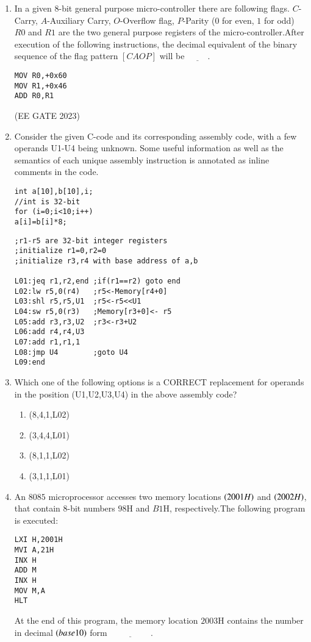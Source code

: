 \begin{enumerate}[label=\arabic*.,ref=\theenumi]
\item In a given $8$-bit general purpose micro-controller there are following flags. $C$-Carry, $A$-Auxiliary Carry, $O$-Overflow flag, $P$-Parity ($0$ for even, $1$ for odd) $R0$ and $R1$ are the two general purpose registers of the micro-controller.After execution of the following instructions, the decimal equivalent of the binary sequence of the flag pattern $[CAOP]$ will be $\underline{\hspace{1cm}}$.\\


\begin{lstlisting}
MOV R0,+0x60
MOV R1,+0x46 
ADD R0,R1
\end{lstlisting}
    
\hfill{(EE GATE 2023)}\\


\item 
Consider the given C-code and its corresponding assembly code, with a few operands U1-U4 being unknown. Some useful information as well as the semantics of each unique assembly instruction is annotated as inline comments in the code.

\begin{lstlisting}
int a[10],b[10],i;
//int is 32-bit
for (i=0;i<10;i++)
a[i]=b[i]*8;
\end{lstlisting}

\begin{lstlisting}
;r1-r5 are 32-bit integer registers
;initialize r1=0,r2=0
;initialize r3,r4 with base address of a,b

L01:jeq r1,r2,end ;if(r1==r2) goto end
L02:lw r5,0(r4)   ;r5<-Memory[r4+0]
L03:shl r5,r5,U1  ;r5<-r5<<U1
L04:sw r5,0(r3)   ;Memory[r3+0]<- r5
L05:add r3,r3,U2  ;r3<-r3+U2
L06:add r4,r4,U3
L07:add r1,r1,1
L08:jmp U4        ;goto U4
L09:end
\end{lstlisting}

\item Which one of the following options is a CORRECT replacement 
for operands in the position (U1,U2,U3,U4) in the above 
assembly code?

\begin{enumerate}
\item (8,4,1,L02)                      
\item (3,4,4,L01)
\item (8,1,1,L02)                             
\item (3,1,1,L01)         
\end{enumerate}
\item An $8085$ microprocessor accesses two memory locations $\left(2001H\right)$ and $\left(2002H\right)$, that contain $8$-bit numbers $98$H and $B1$H, respectively.The following program is executed:
\begin{verbatim}LXI H,2001H
MVI A,21H
INX H
ADD M
INX H
MOV M,A
HLT
\end{verbatim}
At the end of this program, the memory location $2003$H contains the number in decimal $\left(base 10\right)$ form $\underline{\hspace{2cm}}$.


\end{enumerate}
